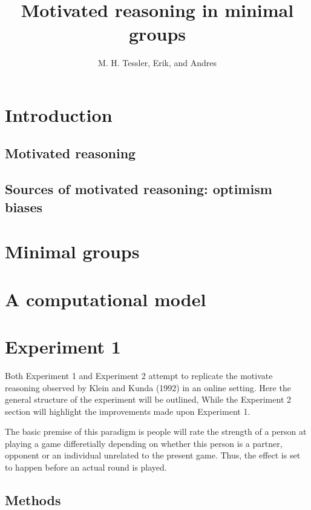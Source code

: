 \documentclass{article} \usepackage{apacite} \usepackage{graphicx} \usepackage{listings}
\begin{document}
 \title{Motivated reasoning in minimal groups}
\author{M. H. Tessler, Erik, and Andres} \renewcommand{\today}{Psych 241\\June 8,
2014} \maketitle

\section{Introduction}

\subsection{Motivated reasoning}

\subsection{Sources of motivated reasoning: optimism biases}

\section{Minimal groups}

\section{A computational model}

\section{Experiment 1}

Both Experiment 1 and Experiment 2 attempt to replicate the motivate reasoning observed by Klein and Kunda (1992) in an online setting. Here the general structure of the experiment will be outlined, While the Experiment 2 section will highlight the improvements made upon Experiment 1. 

The basic premise of this paradigm is people will rate the strength of a person at playing a game differetially depending on whether this person is a partner, opponent or an individual unrelated to the present game. Thus, the effect is set to happen before an actual round is played. 

\subsection{Methods}
\end{document}
